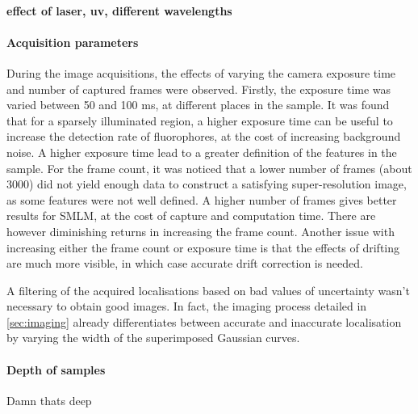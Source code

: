 \paragraph{effect of laser, uv, different wavelengths}

\paragraph{Acquisition parameters}
During the image acquisitions, the effects of varying the camera exposure time and number of captured frames were observed. Firstly, the exposure time was varied between 50 and 100 ms, at different places in the sample. It was found that for a sparsely illuminated region, a higher exposure time can be useful to increase the detection rate of fluorophores, at the cost of increasing background noise. A higher exposure time lead to a greater definition of the features in the sample. For the frame count, it was noticed that a lower number of frames (about 3000) did not yield enough data to construct a satisfying super-resolution image, as some features were not well defined. A higher number of frames gives better results for SMLM, at the cost of capture and computation time. There are however diminishing returns in increasing the frame count. Another issue with increasing either the frame count or exposure time is that the effects of drifting are much more visible, in which case accurate drift correction is needed.

A filtering of the acquired localisations based on bad values of uncertainty wasn't necessary to obtain good images.
In fact, the imaging process detailed in \autoref{sec:imaging} already differentiates between accurate and inaccurate localisation by varying the width of the superimposed Gaussian curves.

\paragraph{Depth of samples}
Damn thats deep